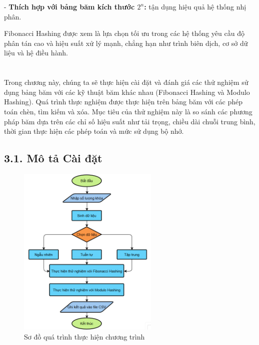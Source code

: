 \documentclass[12pt,a4paper]{report}
\begin{document}
    - \textbf{Thích hợp với bảng băm kích thước $2^n$:} tận dụng hiệu quả hệ thống nhị phân.


Fibonacci Hashing được xem là lựa chọn tối ưu trong các hệ thống yêu cầu độ phân tán cao và hiệu suất xử lý mạnh, chẳng hạn như trình biên dịch, cơ sở dữ liệu và hệ điều hành.

\newpage
\chapter*{}
\noindent \indent Trong chương này, chúng ta sẽ thực hiện cài đặt và đánh giá các thử nghiệm sử dụng bảng băm với các kỹ thuật băm khác nhau (Fibonacci Hashing và Modulo Hashing). Quá trình thực nghiệm được thực hiện trên bảng băm với các phép toán chèn, tìm kiếm và xóa. Mục tiêu của thử nghiệm này là so sánh các phương pháp băm dựa trên các chỉ số hiệu suất như tải trọng, chiều dài chuỗi trung bình, thời gian thực hiện các phép toán và mức sử dụng bộ nhớ.

\section*{3.1. Mô tả Cài đặt}

\begin{figure}[!ht]
    \centering
    \includegraphics[width=0.6\textwidth]{flowchart.png}
    \caption{Sơ đồ quá trình thực hiện chương trình}
    \label{fig:flowchart}
\end{figure}
\end{document}
